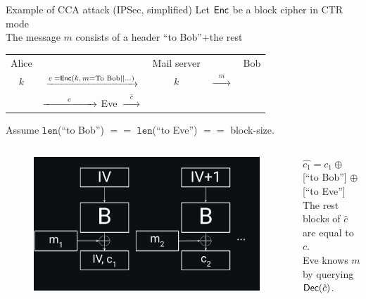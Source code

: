 \documentclass[usenames,dvipsnames, 9pt]{beamer}
\begin{document}
\begin{frame}{Example of CCA attack (IPSec, simplified)}
\Large 
Let $\textsf{Enc}$ be a block cipher in CTR mode \\
The message $m$ consists of a header ``to Bob''+the rest 

\LARGE
	\begin{center}
		\begin{tabular}{c c c c c}
			Alice&     &Mail server  & &Bob\\
			$k$ & {\huge $\xrightarrow{c \;= \textsf{Enc}(k,\, m = \text{To Bob||...})}$ }  &  $k$ & $\xrightarrow{\hspace{10pt}m\hspace{10pt}}$ & \pause\\[8pt] 
			&  $\xrightarrow{\Huge \hspace{1em}c\hspace{1em}}$ Eve  $\xrightarrow{\hspace{1em}\hat{c}\hspace{1em}}$  & & & \\
		\end{tabular}
	\end{center}
\pause
\vspace{4pt}
\Large
Assume $\mathtt{len}$(``to Bob'') $==$  $\mathtt{len}$(``to Eve'') $==$ block-size.
\vspace{15pt}
\begin{columns}
	\begin{column}{0.45\linewidth}
		\begin{figure}
			\includegraphics[width=0.95\linewidth]{CTR}
		\end{figure}
	\end{column}
	\begin{column}{0.55\linewidth}
{\color{Orange} $\hat{c_1} = c_1 \oplus $[``to Bob''] $\oplus$ [``to Eve''] } \\[5pt]
The rest blocks  of $\hat{c}$ are equal to $c$.\\[5pt]
Eve knows $m$ by querying $\textsf{Dec}(\hat{c})$.
	\end{column}

\end{columns}
\end{frame}
\end{document}
